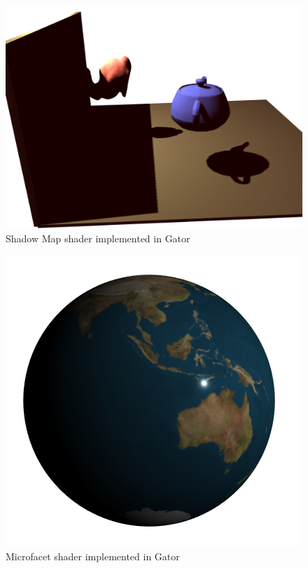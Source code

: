 {\begin{figure}
		\centering
		\includegraphics[width=.7\linewidth]{fig/shadowmap.png}
		\caption{Shadow Map shader implemented in Gator}
		\label{fig:shadowmap}
\end{figure}
\begin{figure}
		\centering
		\includegraphics[width=.7\linewidth]{fig/microfacet.png}
		\caption{Microfacet shader implemented in Gator}
		\label{fig:microfacet}
\end{figure}


}
